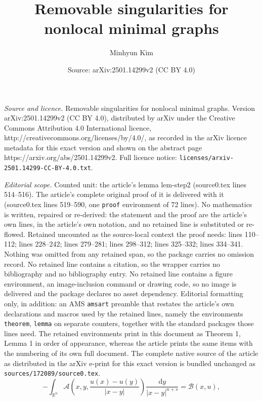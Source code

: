 \documentclass[10pt,a4paper]{amsart}
\title{Removable singularities for nonlocal minimal graphs}
\author{Minhyun Kim}
\date{Source: arXiv:2501.14299v2 (CC BY 4.0)}
\begin{document}
\maketitle

\noindent\emph{Source and licence.} Removable singularities for nonlocal minimal graphs. Version arXiv:2501.14299v2 (CC BY 4.0), distributed by arXiv under the Creative Commons Attribution 4.0 International licence, http://creativecommons.org/licenses/by/4.0/, as recorded in the arXiv licence metadata for this exact version and shown on the abstract page https://arxiv.org/abs/2501.14299v2. Full licence notice: \texttt{licenses/arxiv-2501.14299-CC-BY-4.0.txt}.\par\smallskip

\noindent\textit{Editorial scope.} Counted unit: the article's lemma lem-step2 (source0.tex lines 514--516). The article's complete original proof of it is delivered with it (source0.tex lines 519--590, one \texttt{proof} environment of 72 lines). No mathematics is written, repaired or re-derived: the statement and the proof are the article's own lines, in the article's own notation, and no retained line is substituted or re-flowed.  Retained uncounted as the source-local context the proof needs: lines 110--112; lines 228--242; lines 279--281; lines 298--312; lines 325--332; lines 334--341.  Nothing was omitted from any retained span, so the package carries no omission record.  No retained line contains a citation, so the wrapper carries no bibliography and no bibliography entry.  No retained line contains a figure environment, an image-inclusion command or drawing code, so no image is delivered and the package declares no asset dependency.  Editorial formatting only, in addition: an AMS \texttt{amsart} preamble that restates the article's own declarations and macros used by the retained lines, namely the environments \texttt{theorem}, \texttt{lemma} on separate counters, together with the standard packages those lines need.  The retained environments print in this document as Theorem 1, Lemma 1 in order of appearance, whereas the article prints the same items with the numbering of its own full document.  The complete native source of the article as distributed in the arXiv e-print for this exact version is bundled unchanged as \texttt{sources/172089/source0.tex}.
\begin{equation}\label{eq-main}
- \int_{\mathbb{R}^n} \mathscr{A}\left( x, y, \frac{u(x)-u(y)}{|x-y|} \right) \frac{\mathrm{d}y}{|x-y|^{n+s}} = \mathscr{B}(x, u),
\end{equation}
\end{document}
